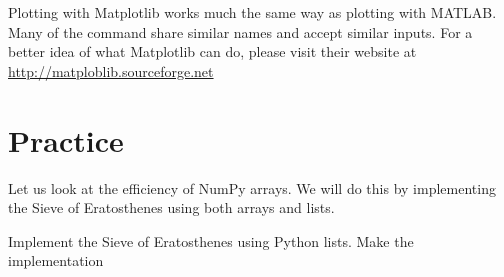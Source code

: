 Plotting with Matplotlib works much the same way as plotting with MATLAB.  Many of the command share similar names and accept similar inputs.  For a better idea of what Matplotlib can do, please visit their website at \url{http://matploblib.sourceforge.net}

\section*{Practice}
Let us look at the efficiency of NumPy arrays.  We will do this by implementing the Sieve of Eratosthenes using both arrays and lists.

\begin{problem}
Implement the Sieve of Eratosthenes using Python lists.  Make the implementation 
\end{problem}
